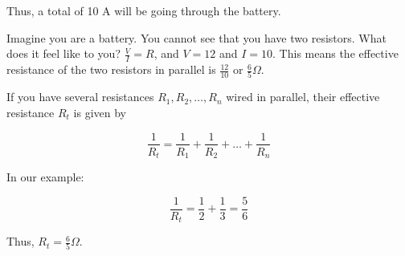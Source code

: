 Thus, a total of 10 A will be going through the battery.

Imagine you are a battery. You cannot see that you have two resistors.
What does it feel like to you? $\frac{V}{I} = R$, and $V= 12$ and $I =
10$. This means the effective resistance of the two resistors in parallel is
$\frac{12}{10}$ or $\frac{6}{5} \Omega$.

\begin{mdframed}[style=important, frametitle={Resistance in Parallel}]
If you have several resistances $R_1, R_2, \ldots, R_n$ wired in
parallel, their effective resistance $R_t$ is given by

$$\frac{1}{R_t} = \frac{1}{R_1} + \frac{1}{R_2} + \ldots + \frac{1}{R_n}$$

\end{mdframed}

In our example:

$$\frac{1}{R_t} = \frac{1}{2} + \frac{1}{3} = \frac{5}{6}$$

Thus, $R_t =  \frac{6}{5}\Omega$.

